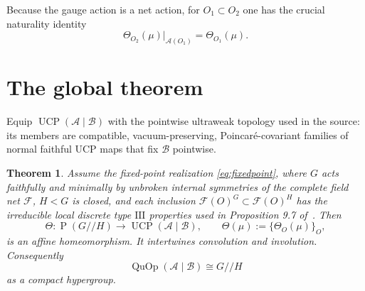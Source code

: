 \documentclass[11pt]{article}
\newtheorem{theorem}{Theorem}
\newcommand{\A}{\mathcal A}
\newcommand{\Bnet}{\mathcal B}
\newcommand{\F}{\mathcal F}
\newcommand{\UCP}{\operatorname{UCP}}
\newcommand{\QuOp}{\operatorname{QuOp}}
\newcommand{\Prob}{\operatorname{P}}
\begin{document}
Because the gauge action is a net action, for $O_1\subset O_2$ one has the
crucial naturality identity
\begin{equation}\label{eq:naturality}
 \Theta_{O_2}(\mu)|_{\A(O_1)}=\Theta_{O_1}(\mu).
\end{equation}

\section{The global theorem}

Equip $\UCP(\A\mid\Bnet)$ with the pointwise ultraweak topology used in the
source: its members are compatible, vacuum-preserving, Poincar\'e-covariant
families of normal faithful UCP maps that fix $\Bnet$ pointwise.

\begin{theorem}\label{thm:main}
Assume the fixed-point realization \eqref{eq:fixedpoint}, where $G$ acts
faithfully and minimally by unbroken internal symmetries of the complete field
net $\F$, $H<G$ is closed, and each inclusion
$\F(O)^G\subset\F(O)^H$ has the irreducible local discrete type
$\mathrm{III}$ properties used in Proposition 9.7 of~\cite{BDG}.  Then
\begin{equation}\label{eq:globalhomeo}
 \Theta:\Prob(G/\!/H)\longrightarrow\UCP(\A\mid\Bnet),
 \qquad \Theta(\mu):=\{\Theta_O(\mu)\}_{O},
\end{equation}
is an affine homeomorphism.  It intertwines convolution and involution.
Consequently
\[
       \QuOp(\A\mid\Bnet)\cong G/\!/H
\]
as a compact hypergroup.
\end{theorem}
\end{document}
